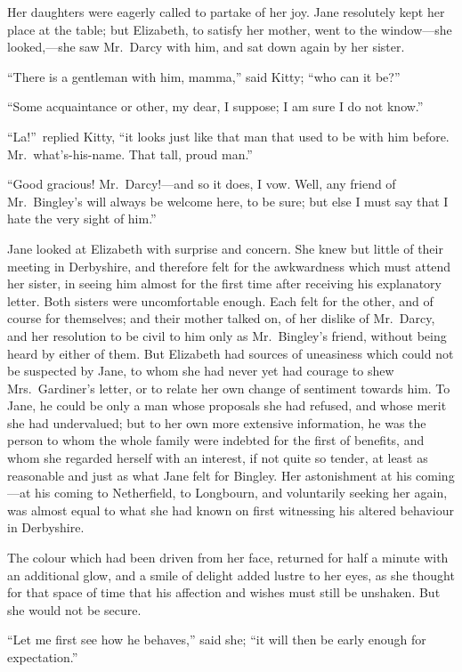 \documentclass[12pt,english,oneside]{book}
\begin{document}
Her daughters were eagerly called to partake of her joy. Jane resolutely
kept her place at the table; but Elizabeth, to satisfy her mother,
went to the window\mbox{---}she looked,\mbox{---}she saw Mr.\ Darcy
with him, and sat down again by her sister.

{}``There is a gentleman with him, mamma,'' said Kitty; {}``who
can it be?''\ 

{}``Some acquaintance or other, my dear, I suppose; I am sure I do
not know.''

{}``La!''\ replied Kitty, {}``it looks just like that man that
used to be with him before. Mr.\ what's-his-name. That tall, proud
man.''

{}``Good gracious! Mr.\ Darcy!\mbox{---}and so it does, I vow.
Well, any friend of Mr.\ Bingley's will always be welcome here, to
be sure; but else I must say that I hate the very sight of him.''

Jane looked at Elizabeth with surprise and concern. She knew but little
of their meeting in Derbyshire, and therefore felt for the awkwardness
which must attend her sister, in seeing him almost for the first time
after receiving his explanatory letter. Both sisters were uncomfortable
enough. Each felt for the other, and of course for themselves; and
their mother talked on, of her dislike of Mr.\ Darcy, and her resolution
to be civil to him only as Mr.\ Bingley's friend, without being heard
by either of them. But Elizabeth had sources of uneasiness which could
not be suspected by Jane, to whom she had never yet had courage to
shew Mrs.\ Gardiner's letter, or to relate her own change of sentiment
towards him. To Jane, he could be only a man whose proposals she had
refused, and whose merit she had undervalued; but to her own more
extensive information, he was the person to whom the whole family
were indebted for the first of benefits, and whom she regarded herself
with an interest, if not quite so tender, at least as reasonable and
just as what Jane felt for Bingley. Her astonishment at his coming\mbox{---}at
his coming to Netherfield, to Longbourn, and voluntarily seeking her
again, was almost equal to what she had known on first witnessing
his altered behaviour in Derbyshire.

The colour which had been driven from her face, returned for half
a minute with an additional glow, and a smile of delight added lustre
to her eyes, as she thought for that space of time that his affection
and wishes must still be unshaken. But she would not be secure.

{}``Let me first see how he behaves,'' said she; {}``it will then
be early enough for expectation.''
\end{document}
